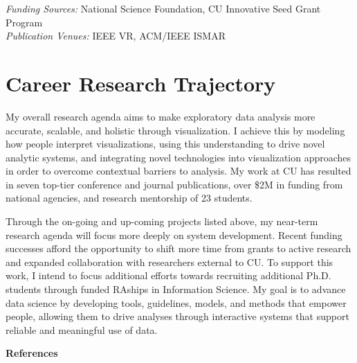 \documentclass[11pt]{article}
\begin{document}

\emph{Funding Sources:} National Science Foundation, CU Innovative Seed Grant Program\\
\emph{Publication Venues:} IEEE VR, ACM/IEEE ISMAR

\section*{Career Research Trajectory}

My overall research agenda aims to 
make exploratory data analysis more accurate, scalable, and holistic through visualization. I achieve this by modeling how people interpret visualizations, using this understanding to drive novel analytic systems, and integrating novel technologies into visualization approaches in order to overcome contextual barriers to analysis. My work at CU has resulted in seven top-tier conference and journal publications, over \$2M in funding from national agencies, and research mentorship of 23 students. 

Through the on-going and up-coming projects listed above, my near-term research agenda will focus more deeply on system development. Recent funding successes afford the opportunity to shift more time from grants to active research and expanded collaboration with researchers external to CU.
To support this work, I intend to focus additional efforts towards recruiting additional Ph.D. students through funded RAships in Information Science.  
My goal 
is to advance 
data science by developing tools, guidelines, models, and methods that empower people, allowing them to drive analyses through interactive systems that support reliable and meaningful use of data.


{
\vspace{4pt}
\noindent
\textbf{References}
\vspace{-24pt}
\renewcommand\refname{\vskip -1cm}
\small


}


\pagebreak
\setcounter{page}{1}
\end{document}
